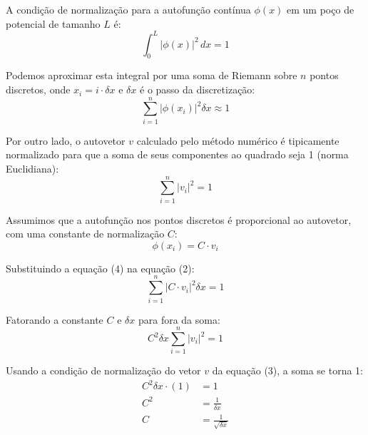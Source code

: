 \documentclass[12pt, a4paper]{article} %
\begin{document}
                A condição de normalização para a autofunção contínua $\phi(x)$ em um poço de potencial de tamanho $L$ é:
                \begin{equation}
                    \int_{0}^{L} |\phi(x)|^2 \,dx = 1
                \end{equation}

                Podemos aproximar esta integral por uma soma de Riemann sobre $n$ pontos discretos, onde $x_i = i \cdot \delta x$ e $\delta x$ é o passo da discretização:
                \begin{equation}
                    \sum_{i=1}^{n} |\phi(x_i)|^2 \delta x \approx 1
                \end{equation}

                Por outro lado, o autovetor $v$ calculado pelo método numérico é tipicamente normalizado para que a soma de seus componentes ao quadrado seja 1 (norma Euclidiana):
                \begin{equation}
                    \sum_{i=1}^{n} |v_i|^2 = 1
                \end{equation}

                Assumimos que a autofunção nos pontos discretos é proporcional ao autovetor, com uma constante de normalização $C$:
                \begin{equation}
                    \phi(x_i) = C \cdot v_i
                \end{equation}

                Substituindo a equação (4) na equação (2):
                \begin{equation}
                    \sum_{i=1}^{n} |C \cdot v_i|^2 \delta x = 1
                \end{equation}

                Fatorando a constante $C$ e $\delta x$ para fora da soma:
                \begin{equation}
                    C^2 \delta x \sum_{i=1}^{n} |v_i|^2 = 1
                \end{equation}

                Usando a condição de normalização do vetor $v$ da equação (3), a soma se torna 1:
                \begin{align*}
                    C^2 \delta x \cdot (1) &= 1 \\
                    C^2 &= \frac{1}{\delta x} \\
                    C &= \frac{1}{\sqrt{\delta x}}
                \end{align*}
\end{document}
